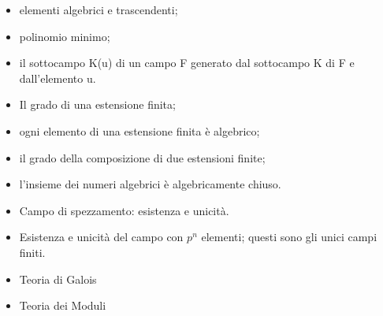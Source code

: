 \documentclass[a4paper,10pt]{article}
\begin{document}
\begin{itemize}
 \item elementi algebrici e trascendenti;
 \item polinomio minimo; 
 \item il sottocampo K(u) di un campo F generato dal sottocampo K di F e dall'elemento u. 
 \item Il grado di una estensione finita; 
 \item ogni elemento di una estensione finita è algebrico; 
 \item il grado della composizione di due estensioni finite; 
 \item l'insieme dei numeri algebrici è algebricamente chiuso. 
 \item Campo di spezzamento: esistenza e unicità. 
 \item Esistenza e unicità del campo con $p^n$ elementi; questi sono gli unici campi finiti.
 \item Teoria di Galois
 \item Teoria dei Moduli
\end{itemize}
\end{document}
